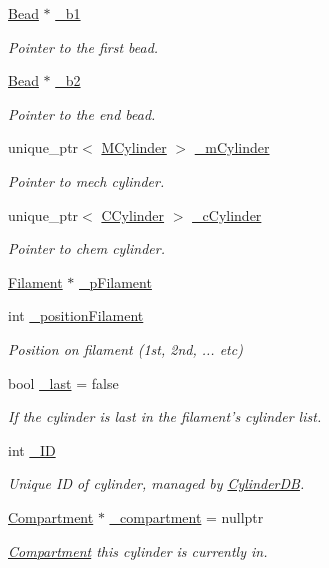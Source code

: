 \begin{DoxyCompactItemize}
\item 
\hyperlink{classBead}{Bead} $\ast$ \hyperlink{classCylinder_a74c9e6c0aaddba6e5b7058c7d58720d7}{\+\_\+b1}
\begin{DoxyCompactList}\small\item\em Pointer to the first bead. \end{DoxyCompactList}\item 
\hyperlink{classBead}{Bead} $\ast$ \hyperlink{classCylinder_a10fe1bbf3340a35637e4a966c1035af6}{\+\_\+b2}
\begin{DoxyCompactList}\small\item\em Pointer to the end bead. \end{DoxyCompactList}\item 
unique\+\_\+ptr$<$ \hyperlink{classMCylinder}{M\+Cylinder} $>$ \hyperlink{classCylinder_acdd582d5e2c3ede46122e1785097e5c3}{\+\_\+m\+Cylinder}
\begin{DoxyCompactList}\small\item\em Pointer to mech cylinder. \end{DoxyCompactList}\item 
unique\+\_\+ptr$<$ \hyperlink{classCCylinder}{C\+Cylinder} $>$ \hyperlink{classCylinder_aacbbbcef8a8a2b6e5810884b017af516}{\+\_\+c\+Cylinder}
\begin{DoxyCompactList}\small\item\em Pointer to chem cylinder. \end{DoxyCompactList}\item 
\hyperlink{classFilament}{Filament} $\ast$ \hyperlink{classCylinder_a0229e3f223dc18ef21fef8db0f2f4b51}{\+\_\+p\+Filament}
\item 
int \hyperlink{classCylinder_a372ecc7b3dc54ca5dd042b043af437d6}{\+\_\+position\+Filament}
\begin{DoxyCompactList}\small\item\em Position on filament (1st, 2nd, ... etc) \end{DoxyCompactList}\item 
bool \hyperlink{classCylinder_ae06f9e43f297b9a2fef8b4b08889c852}{\+\_\+last} = false
\begin{DoxyCompactList}\small\item\em If the cylinder is last in the filament's cylinder list. \end{DoxyCompactList}\item 
int \hyperlink{classCylinder_ab64067f964d785fe166b8a05e5885065}{\+\_\+\+I\+D}
\begin{DoxyCompactList}\small\item\em Unique I\+D of cylinder, managed by \hyperlink{classCylinderDB}{Cylinder\+D\+B}. \end{DoxyCompactList}\item 
\hyperlink{classCompartment}{Compartment} $\ast$ \hyperlink{classCylinder_a2d8861ef62351377c0f6f7ab583cf8d5}{\+\_\+compartment} = nullptr
\begin{DoxyCompactList}\small\item\em \hyperlink{classCompartment}{Compartment} this cylinder is currently in. \end{DoxyCompactList}\end{DoxyCompactItemize}


